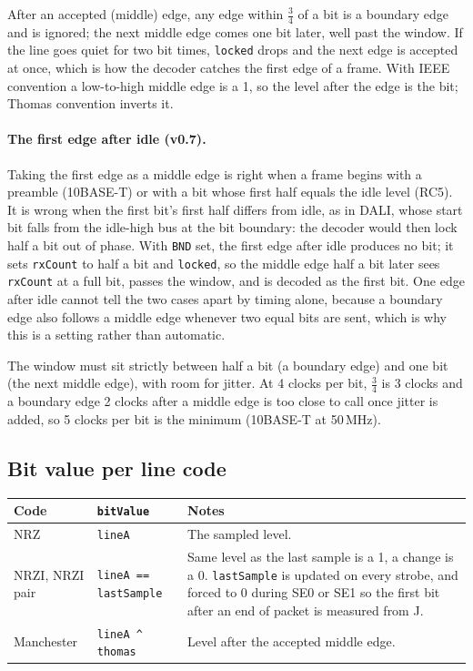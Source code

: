\documentclass[11pt,a4paper]{article}
\newcommand{\sig}[1]{\texttt{#1}}
\begin{document}
After an accepted (middle) edge, any edge within $\frac34$ of a bit is a boundary edge and is ignored; the next middle edge comes one bit later, well past the window. If the line goes quiet for two bit times, \sig{locked} drops and the next edge is accepted at once, which is how the decoder catches the first edge of a frame. With IEEE convention a low-to-high middle edge is a 1, so the level after the edge is the bit; Thomas convention inverts it.

\paragraph{The first edge after idle (v0.7).} Taking the first edge as a middle edge is right when a frame begins with a preamble (10BASE-T) or with a bit whose first half equals the idle level (RC5). It is wrong when the first bit's first half differs from idle, as in DALI, whose start bit falls from the idle-high bus at the bit boundary: the decoder would then lock half a bit out of phase. With \sig{BND} set, the first edge after idle produces no bit; it sets \sig{rxCount} to half a bit and \sig{locked}, so the middle edge half a bit later sees \sig{rxCount} at a full bit, passes the window, and is decoded as the first bit. One edge after idle cannot tell the two cases apart by timing alone, because a boundary edge also follows a middle edge whenever two equal bits are sent, which is why this is a setting rather than automatic.

The window must sit strictly between half a bit (a boundary edge) and one bit (the next middle edge), with room for jitter. At 4 clocks per bit, $\frac34$ is 3 clocks and a boundary edge 2 clocks after a middle edge is too close to call once jitter is added, so 5 clocks per bit is the minimum (10BASE-T at 50\,MHz).

\subsection{Bit value per line code}

\begin{center}
\begin{tabularx}{\linewidth}{@{}l l L@{}}
\toprule
Code & \sig{bitValue} & Notes \\
\midrule
NRZ & \sig{lineA} & The sampled level. \\
NRZI, NRZI pair & \sig{lineA == lastSample} & Same level as the last sample is a 1, a change is a 0. \sig{lastSample} is updated on every strobe, and forced to 0 during SE0 or SE1 so the first bit after an end of packet is measured from J. \\
Manchester & \sig{lineA \^{} thomas} & Level after the accepted middle edge. \\
\bottomrule
\end{tabularx}
\end{center}
\end{document}
